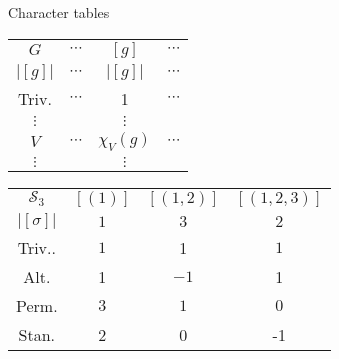 \documentclass[10pt]{beamer}
\newcommand{\Sym}{\mathcal{S}}
\begin{document}
	\begin{frame}{Character tables}
		
		
		\begin{definition}
			\begin{table}[hbt!]
				
				\centering
				\parbox[t]{.45\linewidth}{
					\centering
					\begin{tabular}{c | c c c }
						$G$    & $\cdots $ & $[g]$        & $\cdots$ \\ 
						$|[g]|$ & $\cdots$ & $|[g]|$ & $\cdots$ \\ \hline
						Triv.   & $\cdots$  & 1            & $\cdots$ \\
						$\vdots$ &           & $\vdots$     &          \\
						$V$    & $\cdots$  & $\chi_V(g) $ & $\cdots$ \\
						$\vdots$ &           & $\vdots$     &
					\end{tabular}
				}\pause
				\hfill
				\parbox[t]{.45\linewidth}{
					\centering
						\begin{tabular}{c | c c c }
							$\Sym_3$  & $[(1)]$ & $[(1,2)]$ & $[(1,2,3)]$ \\ 
							$|[\sigma]|$ & $1$ & $3$ & $2$ \\ \hline
							Triv.. & $1$     & 1         & $1$       \\
							Alt.  & 1       & $-1$      & 1         \\
							Perm. & $3$     & $1$       & $0$       \\
							Stan. & 2       & 0         & -1        
						\end{tabular}
				}
			\end{table}
		\end{definition}
	
		
		
	\end{frame}
	
\end{document}
